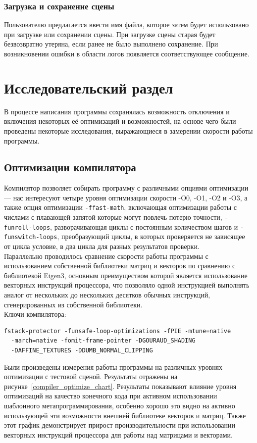 \documentclass[a4paper,12pt]{report}
\numberwithin{equation}{section}
\begin{document}
\subsubsection{Загрузка и сохранение сцены}
Пользователю предлагается ввести имя файла, которое затем будет использовано при загрузке или сохранении сцены. При загрузке сцены старая будет безвозвратно утеряна, если ранее не было выполнено сохранение. При возникновении ошибки в области логов появляется соответствующее сообщение.

\newpage
\section{Исследовательский раздел}
В процессе написания программы сохранялась возможность отключения и включения некоторых её оптимизаций и возможностей, на основе чего были проведены некоторые исследования, выражающиеся в замерении скорости работы программы.

\subsection{Оптимизации компилятора}
Компилятор позволяет собирать программу с различными опциями оптимизации --- нас интересуют четыре уровня оптимизации скорости -O0, -O1, -O2 и -O3, а также опция оптимизации \texttt{-ffast-math}, включающая оптимизации работы с числами с плавающей запятой которые могут повлечь потерю точности, \texttt{-funroll-loops}, разворачивающая циклы с постоянным количеством шагов и \texttt{-funswitch-loops}, преобразующий циклы, в которых проверяется не зависящее от цикла условие, в два цикла для разных результатов проверки. \\
Параллельно проводилось сравнение скорости работы программы с использованием собственной библиотеки матриц и векторов по сравнению с библиотекой Eigen3, основным преимуществом которой является использование векторных инструкций процессора, что позволяло одной инструкцией выполнять аналог от нескольких до нескольких десятков обычных инструкций, сгенерированных из собственной библиотеки. \\
Ключи компилятора:
\begin{verbatim}
fstack-protector -funsafe-loop-optimizations -fPIE -mtune=native
  -march=native -fomit-frame-pointer -DGOURAUD_SHADING
  -DAFFINE_TEXTURES -DDUMB_NORMAL_CLIPPING  
\end{verbatim}
Были произведены измерения работы программы на различных уровнях оптимизации с тестовой сценой. Результаты отражены на рисунке~\ref{compiler_optimize_chart}. Результаты показывают влияние уровня оптимизаций на качество конечного кода при активном использовании шаблонного метапрограммирования, особенно хорошо это видно на активно использующей эти возможности внешней библиотеке векторов и матриц. Также этот график демонстрирует прирост производительности при использовании векторных инструкций процессора для работы над матрицами и векторами.
\end{document}
